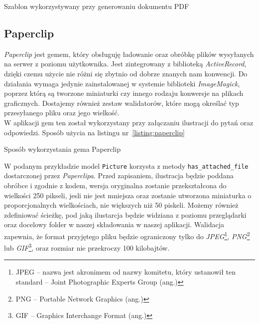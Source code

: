 \documentclass[12pt,twoside]{report}
\begin{document}
\begin{listing}
  
  \caption{Szablon wykorzystywany przy generowaniu dokumentu PDF}
  \label{listing:prawn}
\end{listing}

\subsection{Paperclip}\label{sec:paperclip}
\emph{Paperclip} jest gemem, który obsługuję ładowanie oraz obróbkę plików wysyłanych na
serwer z poziomu użytkownika. Jest zintegrowany z biblioteką \emph{ActiveRecord}, dzięki
czemu użycie nie różni się zbytnio od dobrze znanych nam konwencji. Do działania wymaga
jedynie zainstalowanej w systemie biblioteki \emph{ImageMagick}, poprzez którą są tworzone
miniaturki czy innego rodzaju konwersje na plikach graficznych. Dostajemy również zestaw
walidatorów, które mogą określać typ przesyłanego pliku oraz jego wielkość.\\
W aplikacji gem ten został wykorzystany przy załączaniu ilustracji do pytań oraz odpowiedzi.
Sposób użycia na listingu nr~\ref{listing:paperclip}

\begin{listing}
  
  \caption{Sposób wykorzystania gema Paperclip}
  \label{listing:paperclip}
\end{listing}


W podanym przykładzie model \texttt{Picture} korzysta z metody \texttt{has\_attached\_file}
dostarczonej przez \emph{Paperclipa}. Przed zapisaniem, ilustracja będzie poddana obróbce
i zgodnie z kodem, wersja oryginalna zostanie przekształcona do wielkości 250 pikseli,
jesli nie jest mniejsza oraz zostanie utworzona miniaturka o proporcjonalnych
wielkościach, nie większych niż 50 piskeli. Możemy również zdefiniować ścieżkę, pod jaką
ilustarcja będzie widziana z poziomu przeglądarki oraz docelowy folder w naszej
składowania w naszej aplikacji. Walidacja zapewnia, że format przyjętego pliku będzie
ograniczony tylko do \emph{JPEG}\footnote{JPEG -- nazwa jest akronimem od nazwy komitetu,
który ustanowił ten standard -- Joint Photographic Experts Group (ang.)},
\emph{PNG}\footnote{PNG -- Portable Network Graphics (ang.)} lub \emph{GIF}\footnote{GIF --
Graphics Interchange Format (ang.)}, oraz rozmiar nie przekroczy 100 kilobajtów.
\end{document}
